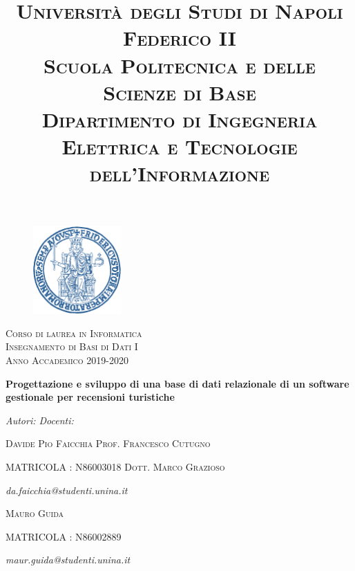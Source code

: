 \documentclass[a4paper,12pt]{article}
\begin{document}
\title { \large \textsc{Università degli Studi di Napoli Federico II \\
		 Scuola Politecnica e delle Scienze di Base} \\
\textsc{Dipartimento di Ingegneria Elettrica e Tecnologie dell’Informazione}}

\author{}
\date{}
\maketitle 
\thispagestyle{empty}

\vspace*{-2cm}
\begin{center}
	\begin{figure}[h]
	\centering
 	\includegraphics[width=0.3\textwidth]{unina_logo.png}
	\end{figure}
	
	\Large \textsc{Corso di laurea in Informatica \\
		   Insegnamento di Basi di Dati I\\
		   Anno Accademico 2019-2020}
\end{center}

\vspace*{+1.5cm}
\begin{center}
\Huge \bf Progettazione e sviluppo di una base di dati relazionale di un software gestionale per recensioni turistiche
\end{center}


\vspace*{-2cm}
\vfill 
\begin{flushleft}
\textit{Autori: \hfill Docenti:}


\normalsize{\textsc{Davide Pio Faicchia \hfill Prof. Francesco Cutugno} 


\textsc{MATRICOLA : N86003018 \hfill Dott. Marco Grazioso}


\textit{da.faicchia@studenti.unina.it}}
\end{flushleft}


\begin{flushleft}
\normalsize{\textsc{Mauro Guida}


\textsc{MATRICOLA : N86002889}


\textit{maur.guida@studenti.unina.it}}
\end{flushleft}
\end{document}
